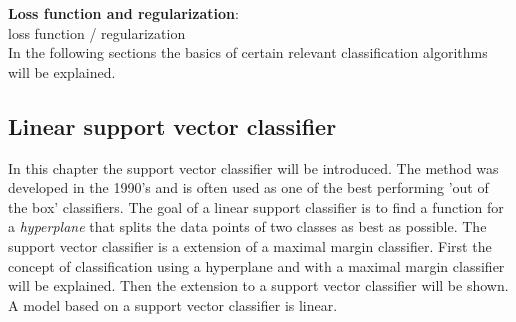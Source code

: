 \textbf{Loss function and regularization}: \\
loss function / regularization
\\


In the following sections the basics of certain relevant classification algorithms will be explained.

\subsection{Linear support vector classifier}
In this chapter the support vector classifier will be introduced. The method was developed in the 1990’s and is often used as one of the best performing 'out of the box' classifiers. The goal of a linear support classifier is to find a function for a \emph{hyperplane} that splits the data points of two classes as best as possible. The support vector classifier is a extension of a maximal margin classifier. First  the concept of classification using a hyperplane and with a maximal margin classifier will be explained. Then the extension to a support vector classifier will be shown.
A model based on a support vector classifier is linear.
